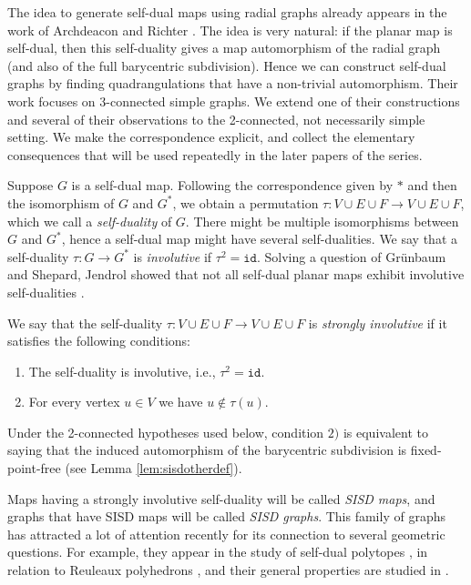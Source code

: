 \documentclass[10pt,a4paper]{article}
\newcommand{\id}{\mathtt{id}}
\begin{document}
    The idea to generate self-dual maps using radial graphs already appears in the work of Archdeacon and Richter \cite{archdeacon1992construction}. The idea is very natural: if the planar map is self-dual, then this self-duality gives a map automorphism of the radial graph (and also of the full barycentric subdivision). Hence we can construct self-dual graphs by finding quadrangulations that have a non-trivial automorphism. Their work focuses on 3-connected simple graphs. We extend one of their constructions and several of their observations to the 2-connected, not necessarily simple setting.  We make the correspondence explicit, and collect the elementary consequences that will be used repeatedly in the later papers of the series. 


Suppose $G$ is a self-dual map. Following the correspondence given by $*$ and then the isomorphism of $G$ and $G^*$, we obtain a permutation $\tau:V\cup E\cup F\rightarrow V\cup E \cup F$, which we call a \emph{self-duality} of $G$. There might be multiple isomorphisms between $G$ and $G^*$, hence a self-dual map might have several self-dualities. We say that a self-duality  $\tau:G\rightarrow G^*$ is \emph{involutive} if $\tau^2=\id$. Solving a question of Grünbaum and Shepard, Jendrol showed that not all self-dual planar maps exhibit involutive self-dualities \cite{grunbaum1988,jendrol1989}.



We say that the self-duality  $\tau:V\cup E\cup F\rightarrow V\cup E \cup F$ is \emph{strongly involutive} if it satisfies the following conditions:
\begin{enumerate}
    \item[1)]  The self-duality is involutive, i.e., $\tau^2=\id$.
    \item[2)]  For every vertex $u\in V$ we have $u \notin \tau (u)$.
\end{enumerate}

Under the 2-connected hypotheses used below, condition $2)$ is equivalent to saying that the induced automorphism of the barycentric subdivision is fixed-point-free (see Lemma \ref{lem:sisdotherdef}).



Maps having a strongly involutive self-duality will be called \emph{SISD maps}, and graphs that have SISD maps will be called \emph{SISD graphs}. This family of graphs has attracted a lot of attention recently for its connection to several geometric questions. For example, they appear in the study of self-dual polytopes \cite{lovasz1983self,gouveia2023self,horvath2021strongly,horvath2025strongly}, in relation to Reuleaux polyhedrons \cite{montejano2020graphs,lopez2023borsuk}, and their general properties are studied in \cite{montejano2022self,bracho2020strongly,bracho202410}.
\end{document}
